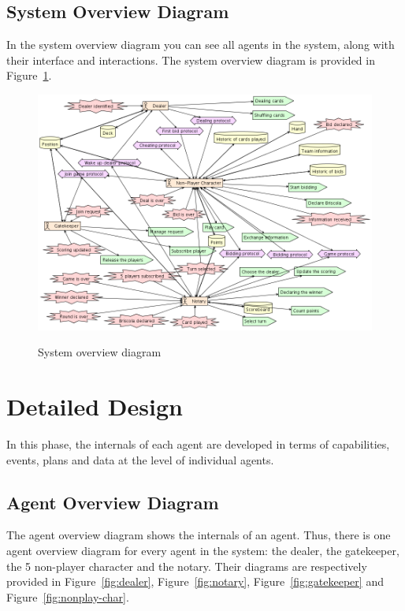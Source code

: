 \documentclass[a4paper]{article}
\begin{document}
\subsection{System Overview Diagram}

In the system overview diagram you can see all agents in the system, along with their interface and interactions. The system overview diagram is provided in Figure~\ref{fig:sysovervw}.

\begin{figure}[htp]
  \centering
  \includegraphics[keepaspectratio,scale=0.45]{pdt/images/architectural_design/system_overview.png}
  \label{fig:sysovervw}
  \caption{System overview diagram}
\end{figure}

\section{Detailed Design}\label{sec:detaildesign}

In this phase, the internals of each agent are developed in terms of capabilities, events, plans and data at the level of individual agents.

\subsection{Agent Overview Diagram}
The agent overview diagram shows the internals of an agent. Thus, there is one agent overview diagram for every agent in the system: the dealer, the gatekeeper, the 5 non-player character and the notary. Their diagrams are respectively provided in Figure~\ref{fig:dealer}, Figure~\ref{fig:notary}, Figure~\ref{fig:gatekeeper} and Figure~\ref{fig:nonplay-char}.
\end{document}

